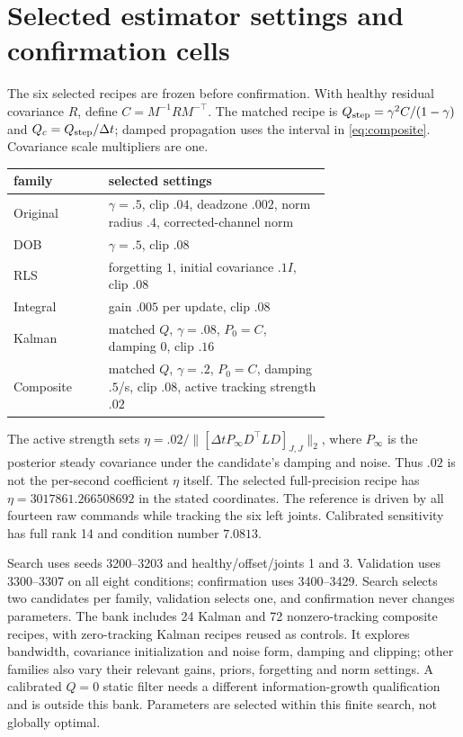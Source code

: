 \documentclass{article}
\begin{document}
\section{Selected estimator settings and confirmation cells}
\label{app:tuning}
The six selected recipes are frozen before confirmation. With healthy residual covariance
$R$, define $C=M^{-1}RM^{-\top}$. The matched recipe is
$Q_{\rm step}=\gamma^2C/(1-\gamma)$ and $Q_c=Q_{\rm step}/\Delta t$; damped propagation
uses the interval in \eqref{eq:composite}. Covariance scale multipliers are one.
\begin{center}\small
\begin{tabular}{lp{0.70\linewidth}}
\toprule
family & selected settings \\
\midrule
Original & $\gamma=.5$, clip $.04$, deadzone $.002$, norm radius $.4$, corrected-channel norm \\
DOB & $\gamma=.5$, clip $.08$ \\
RLS & forgetting $1$, initial covariance $.1I$, clip $.08$ \\
Integral & gain $.005$ per update, clip $.08$ \\
Kalman & matched $Q$, $\gamma=.08$, $P_0=C$, damping $0$, clip $.16$ \\
Composite & matched $Q$, $\gamma=.2$, $P_0=C$, damping $.5$/s, clip $.08$, active tracking strength $.02$ \\
\bottomrule
\end{tabular}
\end{center}
The active strength sets
$\eta=.02/\|[\Delta t P_\infty D^\top L D]_{J,J}\|_2$, where $P_\infty$ is the posterior
steady covariance under the candidate's damping and noise. Thus $.02$ is not the
per-second coefficient $\eta$ itself.
The selected full-precision recipe has $\eta=3017861.266508692$ in the stated coordinates.
The reference is driven by all fourteen raw commands while tracking the six left joints.
Calibrated sensitivity has full rank 14 and condition number $7.0813$.

Search uses seeds 3200--3203 and healthy/offset/joints 1 and 3. Validation uses 3300--3307
on all eight conditions; confirmation uses 3400--3429. Search selects two candidates per
family, validation selects one, and confirmation never changes parameters. The bank includes
24 Kalman and 72 nonzero-tracking composite recipes, with zero-tracking Kalman recipes reused
as controls. It explores bandwidth, covariance initialization and noise form, damping and
clipping; other families also vary their relevant gains, priors, forgetting and norm settings.
A calibrated $Q=0$ static filter needs a different information-growth qualification and is
outside this bank. Parameters are selected within this finite search, not globally optimal.
\end{document}
